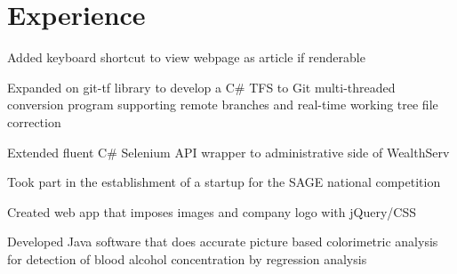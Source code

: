 \documentclass[]{deedy-resume-openfont}
\begin{document}
\begin{minipage}[t]{0.66\textwidth} 


\section{Experience}

\vspace{\topsep}
\begin{tightemize}
\item Added keyboard shortcut to view webpage as article if renderable

\end{tightemize}
\sectionsep


\begin{tightemize}
\item Expanded on git-tf library to develop a C\# TFS to Git multi-threaded conversion program supporting remote branches and real-time working tree file correction

\item Extended fluent C\# Selenium API wrapper to administrative side of WealthServ
\end{tightemize}

\begin{tightemize}
\item Took part in the establishment of a startup for the SAGE national competition
\item Created web app that imposes images and company logo with jQuery/CSS
\item Developed Java software that does accurate picture based colorimetric analysis for detection of blood alcohol concentration by regression analysis %
\end{tightemize}
\sectionsep


\end{minipage}
\end{document}
